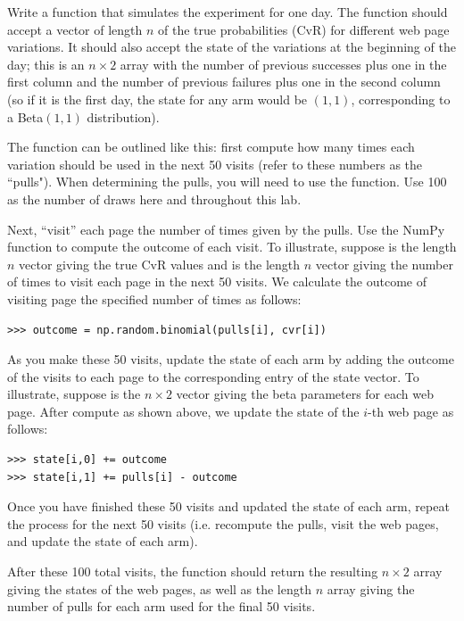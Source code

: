 \begin{problem}
Write a function  that simulates the experiment for one day.
The function should accept a vector of length $n$ of the true probabilities (CvR)
for different web page variations.  It should also accept the state of the variations
at the beginning of the day; this is an $n \times 2$ array with the number of previous
successes plus one in the first column and the number of previous failures plus one in
the second column (so if it is the first day, the state for any arm would be $(1,1)$,
corresponding to a Beta$(1,1)$ distribution).

The function can be outlined like this: first compute how many times each variation
should be used in the next 50 visits (refer to these numbers as the ``pulls").
When determining the pulls, you will need to use
the  function.  Use 100 as the number of draws here and throughout this lab.

Next, ``visit'' each page the number of times given by the pulls.
Use the NumPy function  to compute the outcome of each visit.
To illustrate, suppose  is the length $n$ vector giving the true CvR values
and  is the length $n$ vector giving the number of times to visit each page
in the next 50 visits. We calculate the outcome of visiting page  the
specified number of times as follows:
\begin{lstlisting}
>>> outcome = np.random.binomial(pulls[i], cvr[i])
\end{lstlisting}

As you make these 50 visits, update the state of each arm by adding the outcome of the visits
to each page to the corresponding entry of the state vector.
To illustrate, suppose  is the $n \times 2$ vector giving the beta parameters
for each web page. After compute  as shown above, we update the
state of the $i$-th web page as follows:
\begin{lstlisting}
>>> state[i,0] += outcome
>>> state[i,1] += pulls[i] - outcome
\end{lstlisting}

Once you have finished these 50 visits and updated the state of each arm,
repeat the process for the next 50 visits (i.e. recompute the pulls,
visit the web pages, and update the state of each arm).

After these 100 total visits,
the function should return the resulting $n\times 2$ array giving the states of the web pages,
as well as the length $n$ array giving the number of pulls for each arm used for the final
50 visits.
\end{problem}

